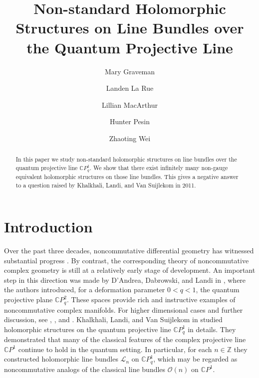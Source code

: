 \documentclass[12pt]{article}
\numberwithin{equation}{section}
\def\C{{\mathbb C}}
\def\L{\mathcal{L}}
\begin{document}


\title{Non-standard Holomorphic Structures on Line Bundles over the Quantum Projective Line}
\author[1]{Mary Graveman}
\author[2]{Landen La Rue}
\author[3]{Lillian MacArthur}
\author[4]{Hunter Pesin}
\author[5]{Zhaoting Wei}


\date{}

\maketitle

\begin{abstract}
In this paper we study non-standard holomorphic structures on line bundles over the quantum projective line $\C P^1_q$. We show that there exist infinitely many non-gauge equivalent holomorphic structures on those line bundles. This gives a negative answer to a question raised by  Khalkhali, Landi, and Van Suijlekom in 2011.
\end{abstract}

\section{Introduction}

\hspace{5mm} Over the past three decades, noncommutative differential geometry has witnessed substantial progress \cite{connes1994noncommutative}. By contrast, the corresponding theory of noncommutative complex geometry is still at a relatively early stage of development. An important step in this direction was made by D'Andrea,  Dabrowski, and Landi in \cite{d2008noncommutative}, where the authors introduced, for a deformation parameter $0<q<1$, the quantum projective plane $\C P^2_q$. These spaces provide  rich and instructive examples of  noncommutative complex manifolds. For higher dimensional cases and further discussion, see \cite{d2010dirac}, \cite{d2010anti}, and \cite{d2013geometry}. Khalkhali, Landi, and Van Suijlekom in \cite{khalkhali2011holomorphic}  studied holomorphic structures on the quantum projective line $\C P^1_q$ in details.  They  demonstrated that many of the classical features of the complex projective line $\C P^1$ continue to hold in the quantum setting. In particular, for each $n\in\mathbb{Z}$ they constructed holomorphic line bundles $\L_n$ on $\C P^1_q$, which may be regarded as noncommutative analogs of the classical line bundles $\mathcal{O}(n)$ on $\C P^1$. 
\end{document}
